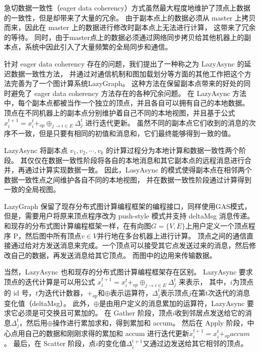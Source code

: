 急切数据一致性（eager data coherency）方式虽然最大程度地维护了顶点上数据的一致性，但是却带来了大量的冗余。
由于副本点上的数据必须从 master 上拷贝而来，因此在 master 上的数据进行修改时副本点上无法进行计算，
这带来了冗余的等待。
同时，由于master点上的数据必须通过网络同步拷贝给其他机器上的副本点，系统中因此引入了大量频繁的全局同步和通信。

针对 eager data coherency 存在的问题，我们提出了一种称之为 LazyAsync 的延迟数据一致性方法，
并通过对通信机制和图加载划分等方面的其他工作把这个方法完善为了一个图计算系统LazyGraph\cite{Wang@PPoPP18}。
这种方法在保留副本点带来的好处的同时避免了 eager data coherency 方法存在的各种冗余问题。
在 LazyAsync 方法中，每个副本点都被当作一个独立的顶点，并且各自可以拥有自己的本地数据。
顶点在不同机器上的副本点分别维护着自己不同的本地视图，并且基于公式
$x_{i}^{t+1}=x_{i}^{t}+_{o p} \oplus_{j \rightarrow i \in E} \Delta_{j}^{t}$
进行迭代更新。
虽然不同的副本点它们收到的消息的次序不一致，但是只要有相同的初值和消息和，它们最终能够得到一致的值\cite{zlj2018}。

LazyAsync 将副本点 $v_1 , v_2 , \cdots , v_k$ 的计算过程分为本地计算和数据一致性两个阶段。
其仅仅在数据一致性阶段将各自的本地消息和其它副本点的远程消息进行合并，再通过计算实现数据一致。
因此，LasyAsync 的模式使得副本点在相邻两个数据一致性点之间维护各自不同的本地视图，
并在数据一致性阶段通过计算得到一致的全局视图。


LazyGraph 保留了现存分布式图计算编程框架的编程接口，同样使用GAS模式，
但是，需要用户将原来顶点程序改为 push-style 模式并支持 deltaMsg 消息传递\cite{zlj2018}。
和现存的分布式图计算编程框架一样，在有向图$G = \{V, E\}$上用户定义一个顶点程序 P，然后图中所有顶点$v \in V$并行地在多台机器上进行计算。
顶点之间的通信直接通过给对方发送消息来完成。一个顶点可以接受其它点发送过来的消息，然后修改自己的数据，再发送消息给其它顶点。
而图中的边用来传输数据。


当然，LazyAsync 也和现存的分布式图计算编程框架存在区别。
LazyAsync 要求顶点的迭代计算是可以用公式 $x_i^{t+1} = x_i^t +_{op} \oplus_{j \rightarrow i \in E} \Delta_j^t$ 来表示，
其中，$i$为顶点的 id 号，$t$为迭代计数器，$+_{op}$和$\oplus$表示运算符，$\Delta_j^t$表示顶点$j$在第t次迭代的消息变化值（deltaMsg）。
此外，$\oplus$是由用户定义的消息累加的运算符，LazyAsync 要求它必须是可交换且可累加的。
在 Gather 阶段，顶点$i$收到邻居点发送给它的消息$\Delta_j^t$，然后用$\oplus$操作进行累加求和，得到累加和 accum。
然后在 Apply 阶段，中心点用自己的数据和刚刚求得的累加和 accum 进行迭代更新$x_i^{t+1} = x_i^t +_{op} accum$。
最后，在 Scatter 阶段，点$i$的变化值$\Delta_i^{t+1}$又通过边发送给其它相邻的顶点。


